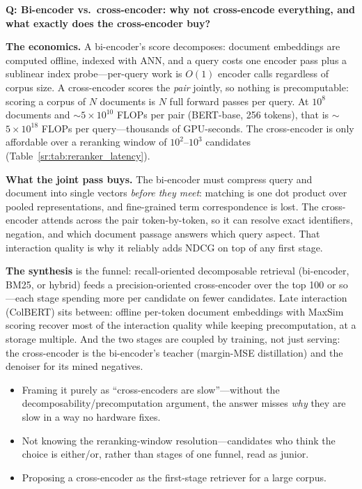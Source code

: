 \begin{interviewq}
\textbf{Q: Bi-encoder vs.\ cross-encoder: why not cross-encode everything, and what exactly does the cross-encoder buy?}

 \quad {} \quad \badgefreq{\freqhigh}

\stronganswer

\textbf{The economics.} A bi-encoder's score decomposes: document embeddings are computed offline, indexed with ANN, and a query costs one encoder pass plus a sublinear index probe---per-query work is $O(1)$ encoder calls regardless of corpus size. A cross-encoder scores the \textit{pair} jointly, so nothing is precomputable: scoring a corpus of $N$ documents is $N$ full forward passes per query. At $10^8$ documents and $\sim$$5 \times 10^{10}$ FLOPs per pair (BERT-base, 256 tokens), that is $\sim$$5 \times 10^{18}$ FLOPs per query---thousands of GPU-seconds. The cross-encoder is only affordable over a reranking window of $10^2$--$10^3$ candidates (Table~\ref{sr:tab:reranker_latency}).

\textbf{What the joint pass buys.} The bi-encoder must compress query and document into single vectors \textit{before they meet}: matching is one dot product over pooled representations, and fine-grained term correspondence is lost. The cross-encoder attends across the pair token-by-token, so it can resolve exact identifiers, negation, and which document passage answers which query aspect. That interaction quality is why it reliably adds NDCG on top of any first stage.

\textbf{The synthesis} is the funnel: recall-oriented decomposable retrieval (bi-encoder, BM25, or hybrid) feeds a precision-oriented cross-encoder over the top 100 or so---each stage spending more per candidate on fewer candidates. Late interaction (ColBERT) sits between: offline per-token document embeddings with MaxSim scoring recover most of the interaction quality while keeping precomputation, at a storage multiple. And the two stages are coupled by training, not just serving: the cross-encoder is the bi-encoder's teacher (margin-MSE distillation) and the denoiser for its mined negatives.

\redflags
\begin{itemize}
    \item Framing it purely as ``cross-encoders are slow''---without the decomposability/precomputation argument, the answer misses \textit{why} they are slow in a way no hardware fixes.
    \item Not knowing the reranking-window resolution---candidates who think the choice is either/or, rather than stages of one funnel, read as junior.
    \item Proposing a cross-encoder as the first-stage retriever for a large corpus.
\end{itemize}


\end{interviewq}
